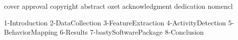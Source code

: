 \documentclass[12pt, leqno, oneside, a4paper]{book}
\begin{document}
\sloppy
{}
{cover}
{approval}
{copyright}
\clearpage \pagebreak
{} \setcounter{page}{3}
{abstract}
{ozet}
{acknowledgment}
{dedication}
{nomencl}
\clearpage \pagebreak
\tableofcontents
\clearpage\pagebreak
{}
{\let\onumline\numberline\renewcommand{\numberline}{\tablename~\onumline}\listoftables}
\clearpage\pagebreak
{}
{\let\onumline\numberline\renewcommand{\numberline}{\figurename~\onumline}\listoffigures}

\pagestyle{fancy}
\renewcommand{\headrulewidth}{0.0pt}
\renewcommand{\footrulewidth}{0.0pt}
\rhead[]{}
\chead[]{}
\lhead[]{}
\lfoot[]{}
\cfoot[]{\thepage}
\rfoot[]{}

\clearpage \pagebreak
 \setcounter{page}{1}
\onehalfspacing
{1-Introduction}
{2-DataCollection}
{3-FeatureExtraction}
{4-ActivityDetection}
{5-BehaviorMapping}
{6-Results}
{7-bastySoftwarePackage}
{8-Conclusion}

\renewcommand{\headrulewidth}{0.0pt}
\renewcommand{\footrulewidth}{0.0pt}
\rhead[]{}
\chead[]{}
\lhead[]{}
\lfoot[]{}
\cfoot[]{\thepage}
\rfoot[]{}

\clearpage \pagebreak \singlespace \normalsize
{}

\end{document}
